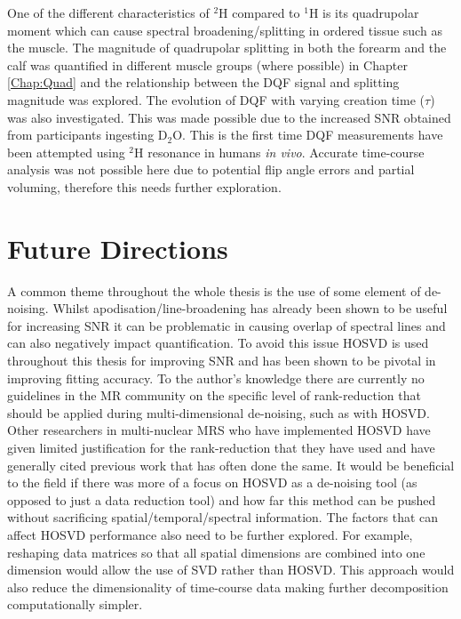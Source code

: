 One of the different characteristics of $^2$H compared to $^1$H is its quadrupolar moment which can cause spectral broadening/splitting in ordered tissue such as the muscle. The magnitude of quadrupolar splitting in both the forearm and the calf was quantified in different muscle groups (where possible) in Chapter \ref{Chap:Quad} and the relationship between the \ac{DQF} signal and splitting magnitude was explored. The evolution of \ac{DQF} with varying creation time ($\tau$) was also investigated. This was made possible due to the increased \ac{SNR} obtained from participants ingesting D$_2$O. This is the first time \ac{DQF} measurements have been attempted using $^2$H resonance in humans \textit{in vivo}. Accurate time-course analysis was not possible here due to potential flip angle errors and partial voluming, therefore this needs further exploration.

\section{Future Directions}

A common theme throughout the whole thesis is the use of some element of de-noising. Whilst apodisation/line-broadening has already been shown to be useful for increasing \ac{SNR} it can be problematic in causing overlap of spectral lines and can also negatively impact quantification. To avoid this issue \ac{HOSVD} is used throughout this thesis for improving \ac{SNR} and has been shown to be pivotal in improving fitting accuracy. To the author's knowledge there are currently no guidelines in the MR community on the specific level of rank-reduction that should be applied during multi-dimensional de-noising, such as with \ac{HOSVD}. Other researchers in multi-nuclear \ac{MRS} who have implemented \ac{HOSVD} have given limited justification for the rank-reduction that they have used and have generally cited previous work that has often done the same\cite{Kreis2020MeasuringMRI, vonMorze2021ComparisonT, Brender2019DynamicHyperpolarization}. It would be beneficial to the field if there was more of a focus on \ac{HOSVD} as a de-noising tool (as opposed to just a data reduction tool) and how far this method can be pushed without sacrificing spatial/temporal/spectral information. The factors that can affect \ac{HOSVD} performance also need to be further explored. For example, reshaping data matrices so that all spatial dimensions are combined into one dimension would allow the use of \ac{SVD} rather than \ac{HOSVD}. This approach would also reduce the dimensionality of time-course data making further decomposition computationally simpler.

